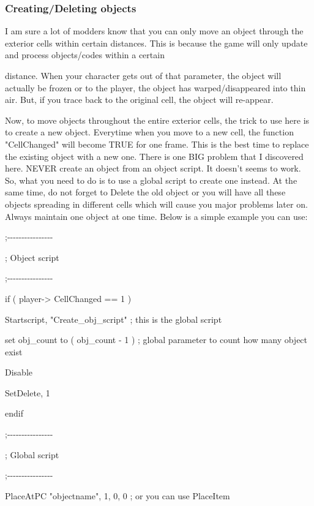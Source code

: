 \hypertarget{creatingdeleting-objects}{%
\subsubsection{\texorpdfstring{Creating/Deleting objects
}{Creating/Deleting objects }}\label{creatingdeleting-objects}}

I am sure a lot of modders know that you can only move an object through
the exterior cells within certain distances. This is because the game
will only update and process objects/codes within a certain

distance. When your character gets out of that parameter, the object
will actually be frozen or to the player, the object has
warped/disappeared into thin air. But, if you trace back to the original
cell, the object will re-appear.

Now, to move objects throughout the entire exterior cells, the trick to
use here is to create a new object. Everytime when you move to a new
cell, the function "CellChanged" will become TRUE for one frame. This is
the best time to replace the existing object with a new one. There is
one BIG problem that I discovered here. NEVER create an object from an
object script. It doesn't seems to work. So, what you need to do is to
use a global script to create one instead. At the same time, do not
forget to Delete the old object or you will have all these objects
spreading in different cells which will cause you major problems later
on. Always maintain one object at one time. Below is a simple example
you can use:

;-\/-\/-\/-\/-\/-\/-\/-\/-\/-\/-\/-\/-\/-\/-\/-

; Object script

;-\/-\/-\/-\/-\/-\/-\/-\/-\/-\/-\/-\/-\/-\/-\/-

if ( player-> CellChanged == 1 )

Startscript, "Create\_obj\_script" ; this is the global script

set obj\_count to ( obj\_count - 1 ) ; global parameter to count how
many object exist

Disable

SetDelete, 1

endif

;-\/-\/-\/-\/-\/-\/-\/-\/-\/-\/-\/-\/-\/-\/-\/-

; Global script

;-\/-\/-\/-\/-\/-\/-\/-\/-\/-\/-\/-\/-\/-\/-\/-

PlaceAtPC "objectname", 1, 0, 0 ; or you can use PlaceItem

